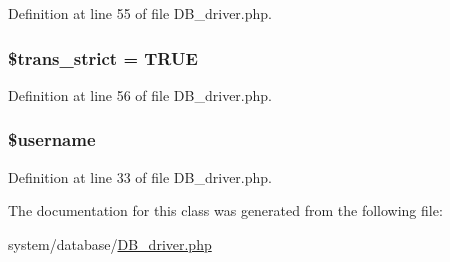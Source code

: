 Definition at line 55 of file D\-B\-\_\-driver.\-php.

\hypertarget{class_c_i___d_b__driver_ae3111155f1f3ec59fe667b90dafb179f}{
\subsubsection[{\$trans\-\_\-strict}]{\setlength{\rightskip}{0pt plus 5cm}\${\bf trans\-\_\-strict} = T\-R\-U\-E}}\label{class_c_i___d_b__driver_ae3111155f1f3ec59fe667b90dafb179f}


Definition at line 56 of file D\-B\-\_\-driver.\-php.

\hypertarget{class_c_i___d_b__driver_a0eb82aa5f81cf845de4b36cd653c42cf}{
\subsubsection[{\$username}]{\setlength{\rightskip}{0pt plus 5cm}\$username}}\label{class_c_i___d_b__driver_a0eb82aa5f81cf845de4b36cd653c42cf}


Definition at line 33 of file D\-B\-\_\-driver.\-php.



The documentation for this class was generated from the following file\-:\begin{DoxyCompactItemize}
\item 
system/database/\hyperlink{_d_b__driver_8php}{D\-B\-\_\-driver.\-php}\end{DoxyCompactItemize}
